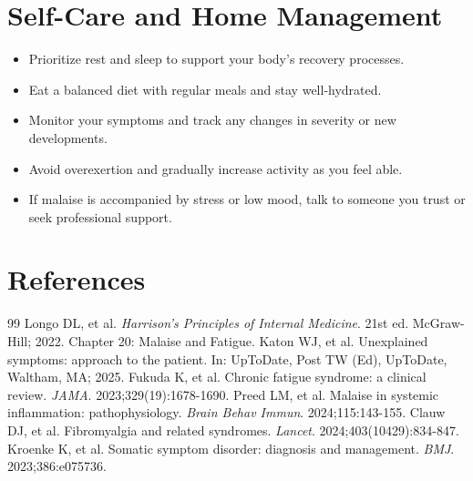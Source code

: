\section*{Self-Care and Home Management}
\begin{itemize}
  \item Prioritize rest and sleep to support your body's recovery processes.
  \item Eat a balanced diet with regular meals and stay well-hydrated.
  \item Monitor your symptoms and track any changes in severity or new developments.
  \item Avoid overexertion and gradually increase activity as you feel able.
  \item If malaise is accompanied by stress or low mood, talk to someone you trust or seek professional support.
\end{itemize}

\section*{References}

\begin{thebibliography}{99}
 Longo DL, et al. \emph{Harrison's Principles of Internal Medicine}. 21st ed. McGraw-Hill; 2022. Chapter 20: Malaise and Fatigue.
 Katon WJ, et al. Unexplained symptoms: approach to the patient. In: UpToDate, Post TW (Ed), UpToDate, Waltham, MA; 2025.
 Fukuda K, et al. Chronic fatigue syndrome: a clinical review. \emph{JAMA}. 2023;329(19):1678-1690.
 Preed LM, et al. Malaise in systemic inflammation: pathophysiology. \emph{Brain Behav Immun}. 2024;115:143-155.
 Clauw DJ, et al. Fibromyalgia and related syndromes. \emph{Lancet}. 2024;403(10429):834-847.
 Kroenke K, et al. Somatic symptom disorder: diagnosis and management. \emph{BMJ}. 2023;386:e075736.
\end{thebibliography}
